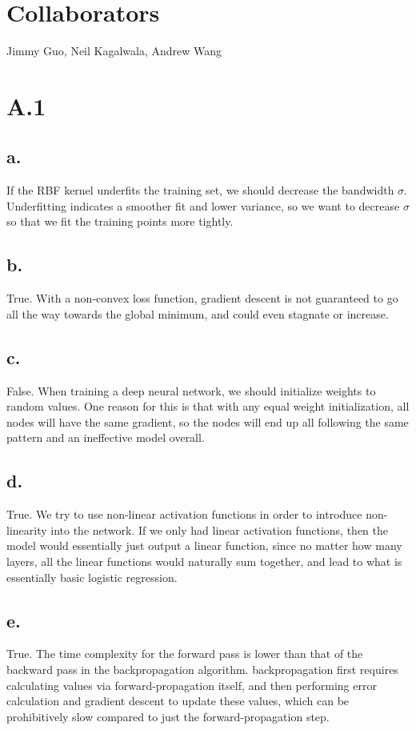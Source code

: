 \documentclass{article}
\date{{}}
\newcommand{\1}{\mathbf{1}}
\begin{document}
\thispagestyle{firstpageheader}

\section*{Collaborators}
{\Large 
Jimmy Guo, Neil Kagalwala, Andrew Wang
}
\section*{A.1}
{\Large 

\subsection*{a.}

If the RBF kernel underfits the training set, we should decrease the bandwidth $\sigma$. Underfitting indicates a smoother fit and lower variance, so we want to decrease $\sigma$ so that we fit the training points more tightly.

\subsection*{b.}

True. With a non-convex loss function, gradient descent is not guaranteed to go all the way towards the global minimum, and could even stagnate or increase.

\subsection*{c.}

False. When training a deep neural network, we should initialize weights to random values. One reason for this is that with any equal weight initialization, all nodes will have the same gradient, so the nodes will end up all following the same pattern and an ineffective model overall.

\subsection*{d.}

True. We try to use non-linear activation functions in order to introduce non-linearity into the network. If we only had linear activation functions, then the model would essentially just output a linear function, since no matter how many layers, all the linear functions would naturally sum together, and lead to what is essentially basic logistic regression.

\subsection*{e.}

True. The time complexity for the forward pass is lower than that of the backward pass in the backpropagation algorithm. backpropagation first requires calculating values via forward-propagation itself, and then performing error calculation and gradient descent to update these values, which can be prohibitively slow compared to just the forward-propagation step.

}
\end{document}
